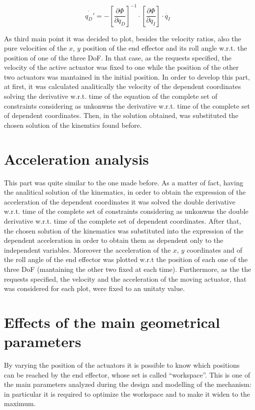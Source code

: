 \documentclass[10.5pt, twocolumn]{article}
\newcommand{\Virgolette}[1]{``#1''}
\begin{document}
{  \begin{equation}
    \dot{q_D'} = -\left[\frac{\partial \Phi }{\partial q_D}\right]^{-1} \cdot \left[\frac{\partial \Phi }{\partial q_I}\right] \cdot \dot{q_I}
  \end{equation}




As third main point it was decided to plot, besides the velocity ratios, also the pure velocities of the \( x \), \( y \) position of the end effector and its roll angle w.r.t. the position of one of the three DoF. In that case, as the requests specified, the velocity of the active actuator was fixed to one while the position of the other two actuators was mantained in the initial position.
In order to develop this part, at first, it was calculated analitically the velocity of the dependent coordinates solving the derivative w.r.t. time of the equation of the complete set of constraints considering as unkonwns the derivative w.r.t. time of the complete set of dependent coordinates. Then, in the solution obtained, was substituted the chosen solution of the kinemtics found before.

\section{Acceleration analysis}
This part was quite similar to the one made before.
As a matter of fact, having the analitical solution of the kinematics, in order to obtain the expression of the acceleration of the dependent coordinates it was solved the double derivative w.r.t. time of the complete set of constraints considering as unkonwns the double derivative w.r.t. time of the complete set of dependent coordinates.
After that, the chosen solution of the kinematics was substituted into the expression of the dependent acceleration in order to obtain them as dependent only to the independent variables.
Moreover the acceleration of the \( x \), \( y \) coordinates and of the roll angle of the end effector was plotted w.r.t the position of each one of the three DoF (mantaining the other two fixed at each time). Furthermore, as the the requests specified, the velocity and the acceleration of the moving actuator, that was considered for each plot, were fixed to an unitaty value.
\section{Effects of the main geometrical parameters}
\label{s:Parameters}
By varying the position of the actuators it is possible to know which positions can be reached by the end effector, whose set is called \Virgolette{workspace}.
This is one of the main parameters analyzed during the design and modelling of the mechanism: in particular it is required to optimize the workspace and to make it widen to the maximum.

}
\end{document}
